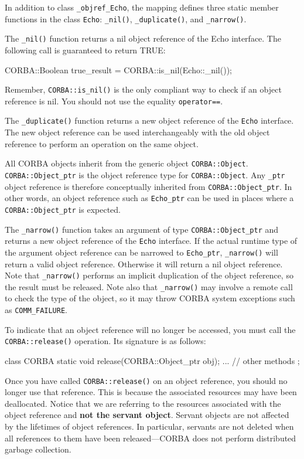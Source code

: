 \documentclass[11pt,twoside,a4paper]{book}
\newcommand{\type}[1]{\texttt{#1}}
\newcommand{\intf}[1]{\texttt{#1}}
\newcommand{\code}[1]{\texttt{#1}}
\newcommand{\op}[1]{\texttt{#1()}}
\newcommand{\dsc}{\discretionary{}{}{}}
\begin{document}
In addition to class \type{\_objref\_Echo}, the mapping defines three
static member functions in the class \type{Echo}: \op{\_nil},
\op{\_duplicate}, and \op{\_narrow}.

The \op{\_nil} function returns a nil object reference of the Echo
interface. The following call is guaranteed to return TRUE:

\begin{cxxlisting}
CORBA::Boolean true_result = CORBA::is_nil(Echo::_nil());
\end{cxxlisting}

Remember, \op{CORBA::is\_nil} is the only compliant way to check if an
object reference is nil. You should not use the equality
\code{operator==}.

The \op{\_duplicate} function returns a new object reference of the
\intf{Echo} interface. The new object reference can be used
interchangeably with the old object reference to perform an operation
on the same object.

All CORBA objects inherit from the generic object
\type{CORBA::Object}.  \type{CORBA::\dsc{}Object\_ptr} is the object
reference type for \type{CORBA::Object}.  Any \type{\_ptr} object
reference is therefore conceptually inherited from
\type{CORBA::Object\_ptr}. In other words, an object reference such as
\type{Echo\_ptr} can be used in places where a
\type{CORBA::Object\_ptr} is expected.

The \op{\_narrow} function takes an argument of type
\type{CORBA::Object\_ptr} and returns a new object reference of the
\intf{Echo} interface.  If the actual runtime type of the argument
object reference can be narrowed to \type{Echo\_ptr}, \op{\_narrow}
will return a valid object reference. Otherwise it will return a nil
object reference. Note that \op{\_narrow} performs an implicit
duplication of the object reference, so the result must be released.
Note also that \op{\_narrow} may involve a remote call to check the
type of the object, so it may throw CORBA system exceptions such as
\code{COMM\_FAILURE}.

To indicate that an object reference will no longer be accessed, you
must call the \op{CORBA::release} operation. Its signature is as
follows:

\begin{cxxlisting}
class CORBA {
  static void release(CORBA::Object_ptr obj);
  ... // other methods
};
\end{cxxlisting}

Once you have called \op{CORBA::release} on an object reference, you
should no longer use that reference. This is because the associated
resources may have been deallocated. Notice that we are referring to
the resources associated with the object reference and \textbf{not the
servant object}. Servant objects are not affected by the lifetimes of
object references. In particular, servants are not deleted when all
references to them have been released---CORBA does not perform
distributed garbage collection.
\end{document}
